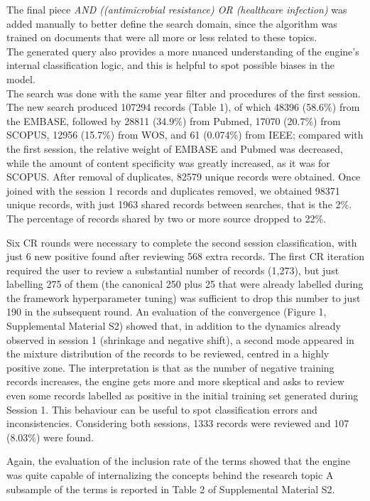 \documentclass{article}
\begin{document}
The final piece \emph{AND ((antimicrobial resistance) OR (healthcare
infection)} was added manually to better define the search domain, since
the algorithm was trained on documents that were all more or less
related to these topics.\\
The generated query also provides a more nuanced understanding of the
engine's internal classification logic, and this is helpful to spot
possible biases in the model.\\

The search was done with the same year filter and procedures of the
first session.\\

The new search produced 107294 records (Table 1), of which 48396
(58.6\%) from the EMBASE, followed by 28811 (34.9\%) from Pubmed, 17070
(20.7\%) from SCOPUS, 12956 (15.7\%) from WOS, and 61 (0.074\%) from
IEEE; compared with the first session, the relative weight of EMBASE and
Pubmed was decreased, while the amount of content specificity was
greatly increased, as it was for SCOPUS. After removal of duplicates,
82579 unique records were obtained. Once joined with the session 1
records and duplicates removed, we obtained 98371 unique records, with
just 1963 shared records between searches, that is the 2\%. The
percentage of records shared by two or more source dropped to 22\%.

Six CR rounds were necessary to complete the second session
classification, with just 6 new positive found after reviewing 568 extra
records. The first CR iteration required the user to review a
substantial number of records (1,273), but just labelling 275 of them
(the canonical 250 plus 25 that were already labelled during the
framework hyperparameter tuning) was sufficient to drop this number to
just 190 in the subsequent round. An evaluation of the convergence
(Figure 1, Supplemental Material S2) showed that, in addition to the
dynamics already observed in session 1 (shrinkage and negative shift), a
second mode appeared in the mixture distribution of the records to be
reviewed, centred in a highly positive zone. The interpretation is that
as the number of negative training records increases, the engine gets
more and more skeptical and asks to review even some records labelled as
positive in the initial training set generated during Session 1. This
behaviour can be useful to spot classification errors and
inconsistencies. Considering both sessions, 1333 records were reviewed
and 107 (8.03\%) were found.

Again, the evaluation of the inclusion rate of the terms showed that the
engine was quite capable of internalizing the concepts behind the
research topic A subsample of the terms is reported in Table 2 of
Supplemental Material S2.
\end{document}
